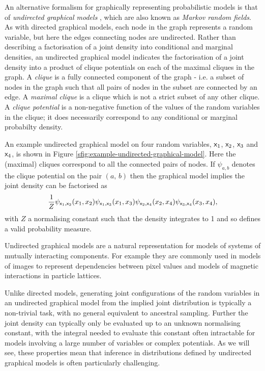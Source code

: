 An alternative formalism for graphically representing probabilistic models is that of \emph{undirected graphical models} \citep{kindermann1980markov}, which are also known as \emph{Markov random fields}. As with directed graphical models, each node in the graph represents a random variable, but here the edges connecting nodes are undirected. Rather than describing a factorisation of a joint density into conditional and marginal densities, an undirected graphical model indicates the factorisation of a joint density into a product of clique potentials on each of the maximal cliques in the graph. A \emph{clique} is a fully connected component of the graph - i.e. a subset of nodes in the graph such that all pairs of nodes in the subset are connected by an edge. A \emph{maximal clique} is a clique which is not a strict subset of any other clique. A \emph{clique potential} is a non-negative function of the values of the random variables in the clique; it does necessarily correspond to any conditional or marginal probabilty density. 

An example undirected graphical model on four random variables, $\mathsf{x}_1$, $\mathsf{x}_2$, $\mathsf{x}_3$ and $\mathsf{x}_4$, is shown in Figure \ref{sfig:example-undirected-graphical-model}. Here the (maximal) cliques correspond to all the connected pairs of nodes. If $\psi_{a,b}$ denotes the clique potential on the pair $(a,\,b)$ then the graphical model implies the joint density can be factorised as
\begin{equation}\label{eq:example-undirected-graphical-model-factorisation}
\begin{split}
  \frac{1}{Z} 
  \psi_{\mathsf{x}_1,\mathsf{x}_2}(x_1,x_2)
  \psi_{\mathsf{x}_1,\mathsf{x}_3}(x_1,x_3)
  \psi_{\mathsf{x}_2,\mathsf{x}_4}(x_2,x_4)
  \psi_{\mathsf{x}_3,\mathsf{x}_4}(x_3,x_4),
\end{split}
\end{equation}
with $Z$ a normalising constant such that the density integrates to 1 and so defines a valid probability measure.

Undirected graphical models are a natural representation for models of systems of mutually interacting components. For example they are commonly used in models of images to represent dependencies between pixel values and models of magnetic interactions in particle lattices. 

Unlike directed models, generating joint configurations of the random variables in an undirected graphical model from the implied joint distribution is typically a non-trivial task, with no general equivalent to ancestral sampling. Further the joint density can typically only be evaluated up to an unknown normalising constant, with the integral needed to evaluate this constant often intractable for models involving a large number of variables or complex potentials. As we will see, these properties mean that inference in distributions defined by undirected graphical models is often particularly challenging.

